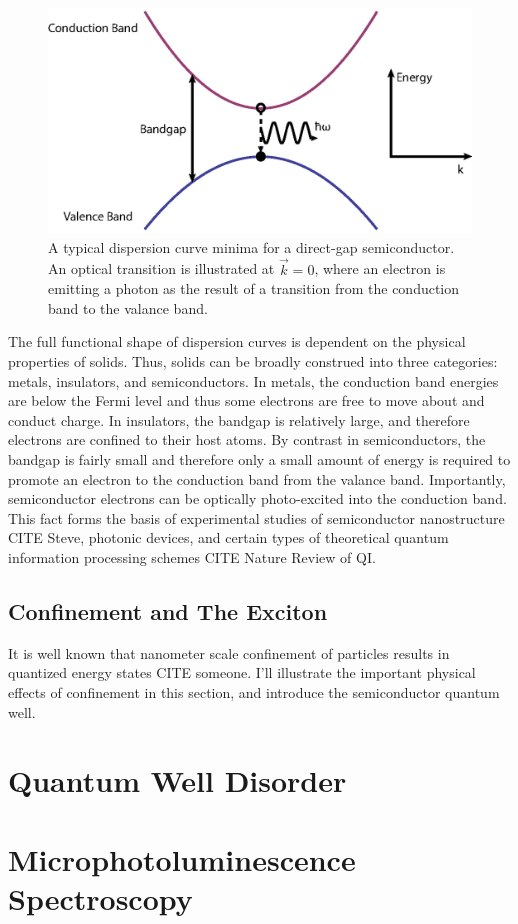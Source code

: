 \begin{figure}[h!]
\centering
\includegraphics[width = .8\textwidth]{dispcurve.eps}
\caption{A typical dispersion curve minima for a direct-gap semiconductor. An optical transition is illustrated at $\vec{k} = 0$, where an electron is emitting a photon as the result of a transition from the conduction band to the valance band.}
\label{Example band structure of a direct-gap semiconductor.}
\end{figure}

\indent The full functional shape of dispersion curves is dependent on the physical properties of solids. Thus, solids can be broadly construed into three categories: metals, insulators, and semiconductors. In metals, the conduction band energies are below the Fermi level and thus some electrons are free to move about and conduct charge. In insulators, the bandgap is relatively large, and therefore electrons are confined to their host atoms. By contrast in semiconductors, the bandgap is fairly small and therefore only a small amount of energy is required to promote an electron to the conduction band from the valance band. Importantly, semiconductor electrons can be optically photo-excited into the conduction band. This fact forms the basis of experimental studies of semiconductor nanostructure CITE Steve, photonic devices, and certain types of theoretical quantum information processing schemes CITE Nature Review of QI.

\subsection{Confinement and The Exciton}

\indent It is well known that nanometer scale confinement of particles results in quantized energy states CITE someone. I'll illustrate the important physical effects of confinement in this section, and introduce the semiconductor quantum well. 

\section{Quantum Well Disorder}




\section{Microphotoluminescence Spectroscopy}
